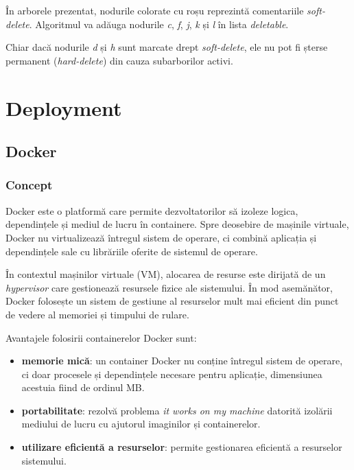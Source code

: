 \vspace{2em}

\par
În arborele prezentat, nodurile colorate cu roșu reprezintă comentariile \textit{soft-delete}. Algoritmul
va adăuga nodurile \textit{c}, \textit{f}, \textit{j}, \textit{k} și \textit{l} în lista \textit{deletable}.
\par
Chiar dacă nodurile \textit{d} și \textit{h} sunt marcate drept \textit{soft-delete}, ele nu pot fi șterse
permanent (\textit{hard-delete}) din cauza subarborilor activi.

\section{Deployment}
\subsection{Docker}

\subsubsection{Concept}
Docker este o platformă care permite dezvoltatorilor să izoleze logica, dependințele și mediul de lucru
în containere. Spre deosebire de mașinile virtuale, Docker nu virtualizează întregul sistem de operare,
ci combină aplicația și dependințele sale cu librăriile oferite de sistemul de operare.
\par
În contextul mașinilor virtuale (VM), alocarea de resurse este dirijată de un \textit{hypervisor} care
gestionează resursele fizice ale sistemului. În mod asemănător, Docker folosește un sistem de gestiune
al resurselor mult mai eficient din punct de vedere al memoriei și timpului de rulare. 
\par
Avantajele folosirii containerelor Docker sunt:
\begin{itemize}
    \item \textbf{memorie mică}: un container Docker nu conține întregul sistem de operare, ci doar
    procesele și dependințele necesare pentru aplicație, dimensiunea acestuia fiind de ordinul MB.
    \item \textbf{portabilitate}: rezolvă problema \textit{it works on my machine} datorită
    izolării mediului de lucru cu ajutorul imaginilor și containerelor.
    \item \textbf{utilizare eficientă a resurselor}: permite gestionarea eficientă a resurselor sistemului.
\end{itemize}

